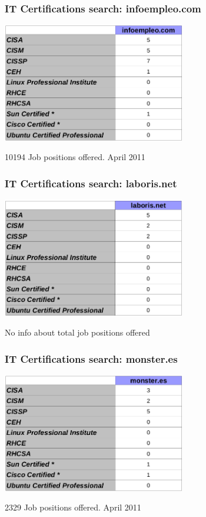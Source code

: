 \documentclass{beamer}
\begin{document}
\begin{frame}
\frametitle{IT Certifications search: infoempleo.com}
\begin{center}
  \includegraphics[width=8cm]{figs/infoempleo.png}
\end{center}
\begin{center}
\normalsize{10194 Job positions offered. April 2011}
\end{center}
\end{frame}



\begin{frame}
\frametitle{IT Certifications search: laboris.net}
\begin{center}
  \includegraphics[width=8cm]{figs/laboris.png}
\end{center}
\begin{center}
\normalsize{No info about total job positions offered}
\end{center}
\end{frame}



\begin{frame}
\frametitle{IT Certifications search: monster.es}
\begin{center}
  \includegraphics[width=8cm]{figs/monster.png}
\end{center}
\begin{center}
\normalsize{2329 Job positions offered. April 2011}
\end{center}
\end{frame}
\end{document}
